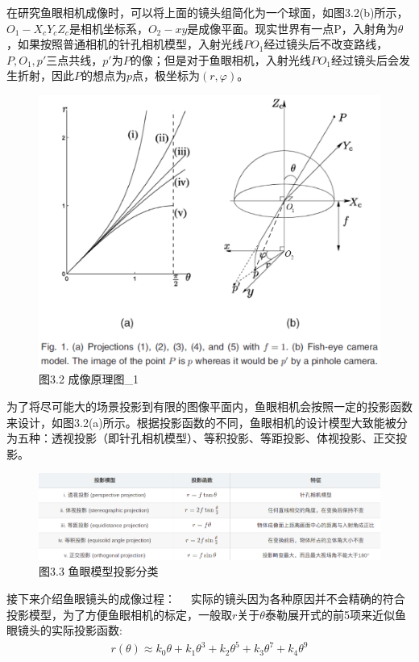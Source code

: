 \documentclass[40pt,a4paper，UTF8]{ctexart}
\numberwithin{equation}{section}
\begin{document}
在研究鱼眼相机成像时，可以将上面的镜头组简化为一个球面，如图3.2(b)所示，$O_1-X_cY_cZ_c$是相机坐标系，$O_2-xy$是成像平面。现实世界有一点P，入射角为$\theta$，如果按照普通相机的针孔相机模型，入射光线$PO_1$经过镜头后不改变路线，$P,O_1,p'$三点共线，$p'$为$P$的像；但是对于鱼眼相机，入射光线$PO_1$经过镜头后会发生折射，因此$P$的想点为$p$点，极坐标为$(r,\varphi)$。
\begin{figure}[H]
\centering
\includegraphics[width=4.8in]{ch4_3_3.png} {图3.2 成像原理图\_1}
\end{figure}

为了将尽可能大的场景投影到有限的图像平面内，鱼眼相机会按照一定的投影函数来设计，如图3.2(a)所示。根据投影函数的不同，鱼眼相机的设计模型大致能被分为五种：透视投影（即针孔相机模型）、等积投影、等距投影、体视投影、正交投影。
\begin{figure}[H]
\centering
\includegraphics[width=4.8in]{ch4_3_4.png} {图3.3 鱼眼模型投影分类}
\end{figure}

接下来介绍鱼眼镜头的成像过程：
 实际的镜头因为各种原因并不会精确的符合投影模型，为了方便鱼眼相机的标定，一般取$r$关于$\theta$泰勒展开式的前5项来近似鱼眼镜头的实际投影函数:
\begin{align}
r(\theta)\approx k_0\theta + k_1 \theta^3 + k_2\theta^5 + k_3\theta^7 + k_4\theta^9
\end{align}
\end{document}
